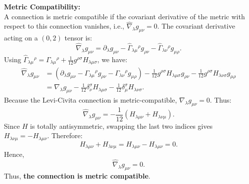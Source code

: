 \documentclass[12pt]{article}
\begin{document}
\begin{enumerate}[label=\alph*)]
\vspace{0.8em}
\noindent\textbf{Metric Compatibility:}\\
A connection is metric compatible if the covariant derivative of the metric with respect to this connection vanishes, i.e., $\hat{\nabla}_\lambda g_{\mu\nu} = 0$. 
The covariant derivative acting on a $(0,2)$ tensor is:
\begin{equation}
\hat{\nabla}_\lambda g_{\mu\nu} = \partial_\lambda g_{\mu\nu} - \hat{\Gamma}_{\lambda\mu}{}^\rho g_{\rho\nu} - \hat{\Gamma}_{\lambda\nu}{}^\rho g_{\mu\rho}.
\end{equation}
Using $\hat{\Gamma}_{\lambda\mu}{}^\rho = \Gamma_{\lambda\mu}{}^\rho + \frac{1}{12} g^{\rho\sigma} H_{\lambda\mu\sigma}$, we have:
\begin{align}
\hat{\nabla}_\lambda g_{\mu\nu} &= \left( \partial_\lambda g_{\mu\nu} - \Gamma_{\lambda\mu}{}^\rho g_{\rho\nu} - \Gamma_{\lambda\nu}{}^\rho g_{\mu\rho} \right) - \frac{1}{12} g^{\rho\sigma} H_{\lambda\mu\sigma} g_{\rho\nu} - \frac{1}{12} g^{\rho\sigma} H_{\lambda\nu\sigma} g_{\mu\rho} \nonumber \\
&= \nabla_\lambda g_{\mu\nu} - \frac{1}{12} \delta^\sigma_\nu H_{\lambda\mu\sigma} - \frac{1}{12} \delta^\sigma_\mu H_{\lambda\nu\sigma}.
\end{align}
Because the Levi-Civita connection is metric-compatible, $\nabla_\lambda g_{\mu\nu} = 0$. Thus:
\begin{equation}
\hat{\nabla}_\lambda g_{\mu\nu} = - \frac{1}{12} \left( H_{\lambda\mu\nu} + H_{\lambda\nu\mu} \right).
\end{equation}
Since $H$ is totally antisymmetric, swapping the last two indices gives $H_{\lambda\nu\mu} = - H_{\lambda\mu\nu}$. Therefore:
\begin{equation}
H_{\lambda\mu\nu} + H_{\lambda\nu\mu} = H_{\lambda\mu\nu} - H_{\lambda\mu\nu} = 0.
\end{equation}
Hence,
\begin{equation}
\hat{\nabla}_\lambda g_{\mu\nu} = 0.
\end{equation}
Thus, \textbf{the connection is metric compatible}.


\end{enumerate}
\end{document}
